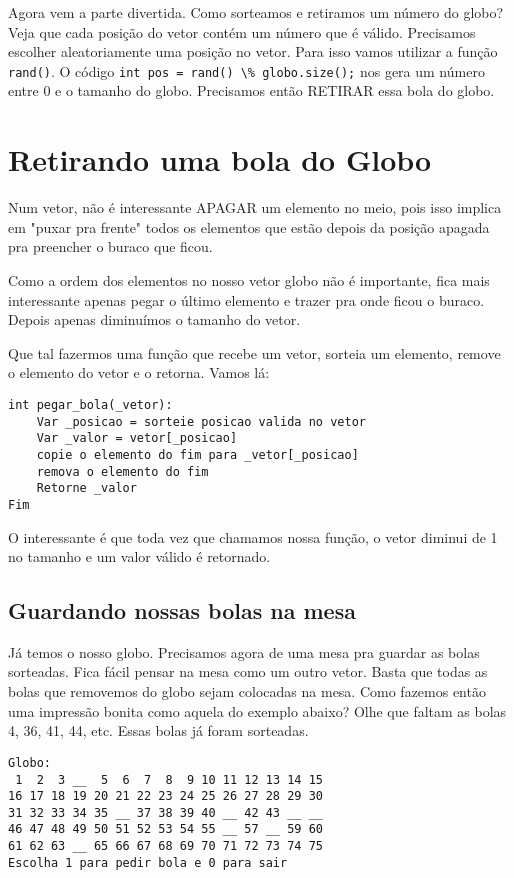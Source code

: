 \documentclass[12pt]{article}
\newcommand{\code}[1]{\lstinline|#1|} %
\begin{document}
Agora vem a parte divertida. Como sorteamos e retiramos um número do globo?
Veja que cada posição do vetor contém um número que é válido. Precisamos
escolher aleatoriamente uma posição no vetor. Para isso vamos utilizar a
função \code{rand()}. O código \code{int pos = rand() \% globo.size();} 
nos gera um número entre 0 e o tamanho do globo. Precisamos então RETIRAR essa
bola do globo. 

\section{Retirando uma bola do Globo}

Num vetor, não é interessante APAGAR um elemento no meio, pois isso implica em 
"puxar pra frente" todos os elementos que estão depois da posição apagada 
pra preencher o buraco que ficou.

Como a ordem dos elementos no nosso vetor globo não é importante, fica mais
interessante apenas pegar o último elemento e trazer pra onde ficou o buraco.
Depois apenas diminuímos o tamanho do vetor.

Que tal fazermos uma função que recebe um vetor, sorteia um elemento, remove o 
elemento do vetor e o retorna. Vamos lá:

\begin{lstlisting}
int pegar_bola(_vetor):
	Var _posicao = sorteie posicao valida no vetor
	Var _valor = vetor[_posicao]
	copie o elemento do fim para _vetor[_posicao]
	remova o elemento do fim
	Retorne _valor
Fim
\end{lstlisting}

O interessante é que toda vez que chamamos nossa função, o vetor diminui de 1
no tamanho e um valor válido é retornado.

\subsection{Guardando nossas bolas na mesa}

Já temos o nosso globo. Precisamos agora de uma mesa pra guardar as bolas
sorteadas. Fica fácil pensar na mesa como um outro vetor. Basta que todas as
bolas que removemos do globo sejam colocadas na mesa. Como fazemos então uma
impressão bonita como aquela do exemplo abaixo? Olhe que faltam as bolas 4, 36,
41, 44, etc. Essas bolas já foram sorteadas.

\begin{verbatim}
Globo:
 1  2  3 __  5  6  7  8  9 10 11 12 13 14 15 
16 17 18 19 20 21 22 23 24 25 26 27 28 29 30 
31 32 33 34 35 __ 37 38 39 40 __ 42 43 __ __ 
46 47 48 49 50 51 52 53 54 55 __ 57 __ 59 60 
61 62 63 __ 65 66 67 68 69 70 71 72 73 74 75 
Escolha 1 para pedir bola e 0 para sair
\end{verbatim}
\end{document}
